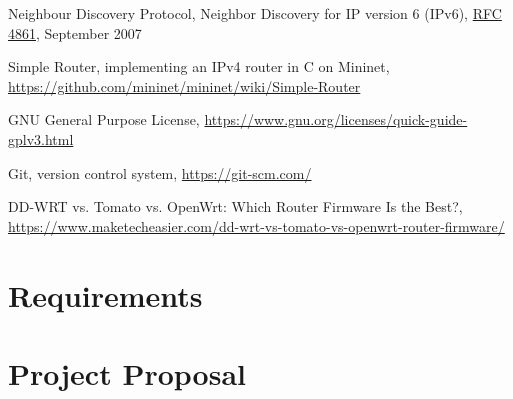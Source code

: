 \documentclass[12pt,a4paper,twoside,openright]{report}
\begin{document}
\begin{thebibliography}{1}
 Neighbour Discovery Protocol, Neighbor Discovery for IP version 6 (IPv6), \href{https://tools.ietf.org/html/rfc4861}{RFC 4861}, September 2007

 Simple Router, implementing an IPv4 router in C on Mininet, \url{https://github.com/mininet/mininet/wiki/Simple-Router}

 GNU General Purpose License, \url{https://www.gnu.org/licenses/quick-guide-gplv3.html}

 Git, version control system, \url{https://git-scm.com/}

 DD-WRT vs. Tomato vs. OpenWrt: Which Router Firmware Is the Best?, \url{https://www.maketecheasier.com/dd-wrt-vs-tomato-vs-openwrt-router-firmware/}

\end{thebibliography}

\appendix

\chapter{Requirements}
\label{appendix::requirements}



\chapter*{Project Proposal}
\label{project_proposal}


\end{document}
